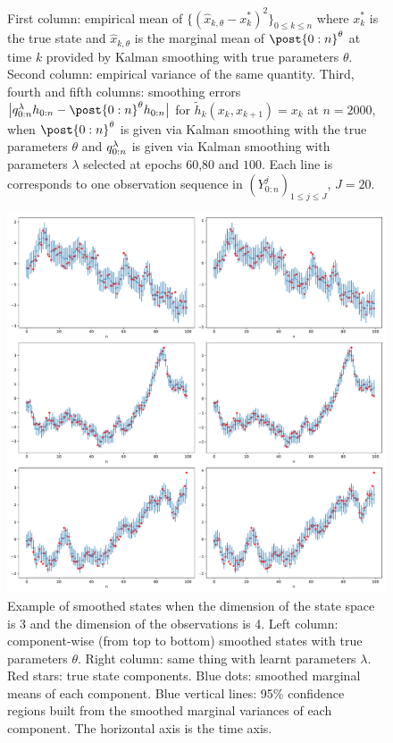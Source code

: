 \documentclass{article}
\begin{document}
\begin{figure}
    \caption{First column: empirical mean of $\{(\hat{x}_{k, \theta} - x_k^{*})^2\}_{0 \leqslant k \leqslant n}$ where $x_k^{*}$ is the true state and $\hat{x}_{k, \theta}$ is the marginal mean of $\post{0:n}^\parvec$ at time $k$ provided by Kalman smoothing with true parameters $\theta$. Second column: empirical variance of the same quantity. Third, fourth and fifth columns: smoothing errors $\big| \vd{0:n} h_{0:n} -  \post{0:n}^{\parvec} h_{0:n} \big|$ for $\tilde{h}_{k}(x_k, x_{k+1}) = x_k$ at $n = 2000$, when $\post{0:n}^\parvec$ is given via Kalman smoothing with the true parameters $\theta$ and $q_{0:n}^{\lambda}$ is given via Kalman smoothing with parameters $\lambda$ selected at epochs $60$,$80$ and $100$. Each line is corresponds to one observation sequence in $(Y^j_{0:n})_{1\leq j \leq J}$, $J=20$.}
    \label{fig:table_linear_gaussian_appendix}
\end{figure}

\begin{figure}
  \centering
  \includegraphics[width=\linewidth, height=0.8\textwidth]{./example_smoothed_states.pdf}
  \caption{Example of smoothed states when the dimension of the state space is 3 and the dimension of the observations is 4. Left column: component-wise (from top to bottom) smoothed states with true parameters $\theta$. Right column: same thing with learnt parameters $\lambda$. Red stars: true state components. Blue dots: smoothed marginal means of each component. Blue vertical lines: 95\% confidence regions built from the smoothed marginal variances of each component. The horizontal axis is the time axis.}
  \label{fig:smoothing_multidimensional}
\end{figure}%
\end{document}
